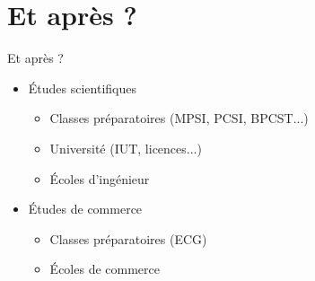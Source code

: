 \documentclass[17pt,xcolor=x11names]{beamer}
\begin{document}
\section*{Et après ?}
\begin{frame}{Et après ?}
  \begin{itemize}
    \item Études scientifiques
      \begin{itemize}
        \item Classes préparatoires (MPSI, PCSI, BPCST...)
        \item Université (IUT, licences...)
        \item Écoles d'ingénieur
      \end{itemize}
    \item Études de commerce
      \begin{itemize}
        \item Classes préparatoires (ECG)
        \item Écoles de commerce
      \end{itemize}
  \end{itemize}
\end{frame}
\end{document}

